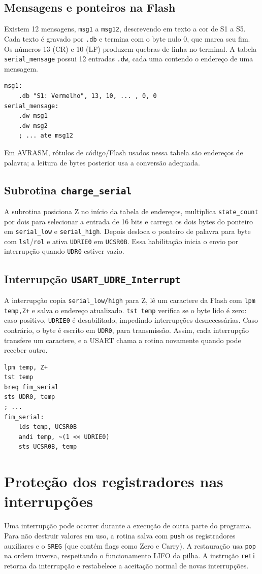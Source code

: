\documentclass[12pt,a4paper]{article}
\newcommand{\reg}[1]{\texttt{#1}}
\begin{document}
\subsection{Mensagens e ponteiros na Flash}
Existem 12 mensagens, \reg{msg1} a \reg{msg12}, descrevendo em texto a cor de S1 a S5. Cada texto é gravado por \reg{.db} e termina com o byte nulo 0, que marca seu fim. Os números 13 (CR) e 10 (LF) produzem quebras de linha no terminal. A tabela \reg{serial\_mensage} possui 12 entradas \reg{.dw}, cada uma contendo o endereço de uma mensagem.
\begin{lstlisting}
msg1:
    .db "S1: Vermelho", 13, 10, ... , 0, 0
serial_mensage:
    .dw msg1
    .dw msg2
    ; ... ate msg12
\end{lstlisting}
Em AVRASM, rótulos de código/Flash usados nessa tabela são endereços de palavra; a leitura de bytes posterior usa a conversão adequada.

\subsection{Subrotina \texttt{charge\_serial}}
A subrotina posiciona Z no início da tabela de endereços, multiplica \reg{state\_count} por dois para selecionar a entrada de 16 bits e carrega os dois bytes do ponteiro em \reg{serial\_low} e \reg{serial\_high}. Depois desloca o ponteiro de palavra para byte com \reg{lsl}/\reg{rol} e ativa \reg{UDRIE0} em \reg{UCSR0B}. Essa habilitação inicia o envio por interrupção quando \reg{UDR0} estiver vazio.

\subsection{Interrupção \texttt{USART\_UDRE\_Interrupt}}
A interrupção copia \reg{serial\_low/high} para Z, lê um caractere da Flash com \reg{lpm temp,Z+} e salva o endereço atualizado. \reg{tst temp} verifica se o byte lido é zero: caso positivo, \reg{UDRIE0} é desabilitado, impedindo interrupções desnecessárias. Caso contrário, o byte é escrito em \reg{UDR0}, para transmissão. Assim, cada interrupção transfere um caractere, e a USART chama a rotina novamente quando pode receber outro.
\begin{lstlisting}
lpm temp, Z+
tst temp
breq fim_serial
sts UDR0, temp
; ...
fim_serial:
    lds temp, UCSR0B
    andi temp, ~(1 << UDRIE0)
    sts UCSR0B, temp
\end{lstlisting}

\section{Proteção dos registradores nas interrupções}
Uma interrupção pode ocorrer durante a execução de outra parte do programa. Para não destruir valores em uso, a rotina salva com \reg{push} os registradores auxiliares e o \reg{SREG} (que contém flags como Zero e Carry). A restauração usa \reg{pop} na ordem inversa, respeitando o funcionamento LIFO da pilha. A instrução \reg{reti} retorna da interrupção e restabelece a aceitação normal de novas interrupções.
\end{document}
